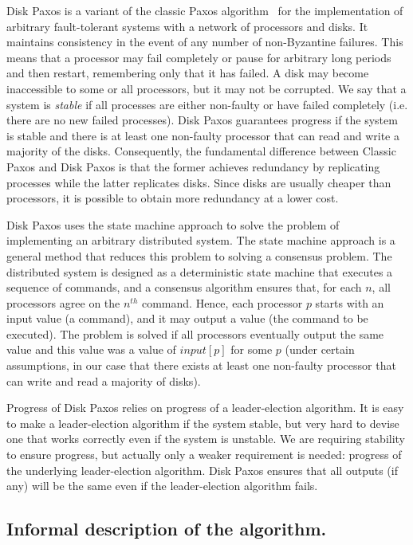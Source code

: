 Disk Paxos is a variant of the classic Paxos
algorithm~\cite{Lamport98parttime} for the implementation of arbitrary
fault-tolerant systems with a network of processors and disks. It
maintains consistency in the event of any number of non-Byzantine
failures. This means that a processor may fail completely or pause for
arbitrary long periods and then restart, remembering only that it has
failed. A disk may become inaccessible to some or all processors, but
it may not be corrupted. We say that a system is \emph{stable} if all
processes are either non-faulty or have failed completely (i.e. there
are no new failed processes). Disk Paxos guarantees progress if the
system is stable and there is at least one non-faulty processor that
can read and write a majority of the disks.  Consequently, the
fundamental difference between Classic Paxos and Disk Paxos is that
the former achieves redundancy by replicating processes while the
latter replicates disks. Since disks are usually cheaper than
processors, it is possible to obtain more redundancy at a lower cost.

\tla

Disk Paxos uses the state machine approach to solve the problem of
implementing an arbitrary distributed system. The state machine
approach \cite{Schneider90implementing} is a general method that
reduces this problem to solving a consensus problem. The distributed
system is designed as a deterministic state machine that executes a
sequence of commands, and a consensus algorithm ensures that, for each
$n$, all processors agree on the $n^{th}$ command. Hence, each
processor $p$ starts with an input value (a command), and it may
output a value (the command to be executed).  The problem is solved if
all processors eventually output the same value and this value was a
value of $input[p]$ for some $p$ (under certain assumptions, in our
case that there exists at least one non-faulty processor that can
write and read a majority of disks).
\notla

Progress of Disk Paxos relies on progress of a leader-election
algorithm. It is easy to make a leader-election algorithm if the
system stable, but very hard to devise one that works correctly even
if the system is unstable. We are requiring stability to ensure
progress, but actually only a weaker requirement is needed: progress
of the underlying leader-election algorithm.  Disk Paxos ensures that
all outputs (if any) will be the same even if the leader-election algorithm
fails.


\subsection{Informal description of the algorithm.}

